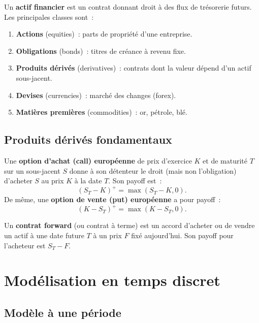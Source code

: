 \begin{definition}
Un \textbf{actif financier} est un contrat donnant droit \`a des flux
de tr\'esorerie futurs. Les principales classes sont~:
\begin{enumerate}
    \item \textbf{Actions} (equities)~: parts de propri\'et\'e d'une entreprise.
    \item \textbf{Obligations} (bonds)~: titres de cr\'eance \`a revenu fixe.
    \item \textbf{Produits d\'eriv\'es} (derivatives)~: contrats dont la valeur
          d\'epend d'un actif sous-jacent.
    \item \textbf{Devises} (currencies)~: march\'e des changes (forex).
    \item \textbf{Mati\`eres premi\`eres} (commodities)~: or, p\'etrole, bl\'e.
\end{enumerate}
\end{definition}

\subsection{Produits d\'eriv\'es fondamentaux}

\begin{definition}
Une \textbf{option d'achat (call) europ\'eenne} de prix d'exercice $K$ et
de maturit\'e $T$ sur un sous-jacent $S$ donne \`a son d\'etenteur le droit
(mais non l'obligation) d'acheter $S$ au prix $K$ \`a la date $T$. Son
payoff est~:
\[
    (S_T - K)^+ = \max(S_T - K, 0).
\]
De m\^eme, une \textbf{option de vente (put) europ\'eenne} a pour payoff~:
\[
    (K - S_T)^+ = \max(K - S_T, 0).
\]
\end{definition}

\begin{definition}
Un \textbf{contrat forward} (ou contrat \`a terme) est un accord d'acheter
ou de vendre un actif \`a une date future $T$ \`a un prix $F$ fix\'e
aujourd'hui. Son payoff pour l'acheteur est $S_T - F$.
\end{definition}

\section{Mod\'elisation en temps discret}

\subsection{Mod\`ele \`a une p\'eriode}

